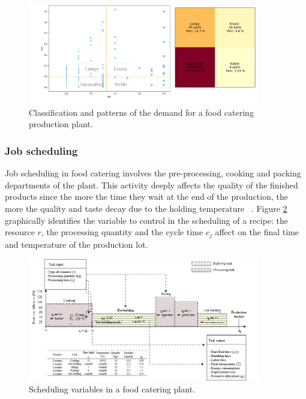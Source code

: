 \begin{figure}[hbt!]
\centering
\includegraphics[width=0.9\textwidth]{sectionProduction/control_figures/fig_prod_CAMST_demandPatterns.png}
\captionsetup{type=figure}
\caption{Classification and patterns of the demand for a food catering production plant.}
\label{fig_prod_CAMST_demandPatterns}
\end{figure}

\subsubsection{Job scheduling}
Job scheduling in food catering involves the pre-processing, cooking and packing departments of the plant. This activity deeply affects the quality of the finished products since the more the time they wait at the end of the production, the more the quality and taste decay due to the holding temperature ~\cite{Tufano2020}. Figure \ref{fig_prod_CAMST_scheduling} graphically identifies the variable to control in the scheduling of a recipe: the resource $r$, the processing quantity and the cycle time $c_j$ affect on the final time and temperature of the production lot.

\begin{figure}[hbt!]
\centering
\includegraphics[width=0.9\textwidth]{sectionProduction/control_figures/fig_prod_CAMST_scheduling.png}
\captionsetup{type=figure}
\caption{Scheduling variables in a food catering plant.}
\label{fig_prod_CAMST_scheduling}
\end{figure}

